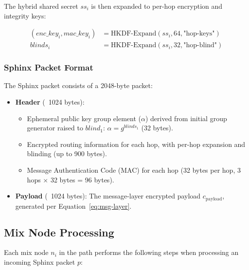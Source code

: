 \documentclass[11pt]{article}
\theoremstyle{definition}
\theoremstyle{remark}
\begin{document}
The hybrid shared secret $ss_i$ is then expanded to per-hop encryption and integrity keys:

\begin{align}
(enc\_key_i, mac\_key_i) &= \text{HKDF-Expand}(ss_i, 64, \text{"hop-keys"}) \label{eq:hop-keys}\\
blinds_i &= \text{HKDF-Expand}(ss_i, 32, \text{"hop-blind"}) \label{eq:blinding}
\end{align}

\subsubsection{Sphinx Packet Format}

The Sphinx packet consists of a 2048-byte packet:

\begin{itemize}
    \item \textbf{Header} (~1024 bytes):
    \begin{itemize}
        \item Ephemeral public key group element ($\alpha$) derived from initial group generator raised to $blind_1$: $\alpha = g^{blinds_1}$ (32 bytes).
        \item Encrypted routing information for each hop, with per-hop expansion and blinding (up to 900 bytes).
        \item Message Authentication Code (MAC) for each hop (32 bytes per hop, 3 hops $\times$ 32 bytes = 96 bytes).
    \end{itemize}

    \item \textbf{Payload} (~1024 bytes): The message-layer encrypted payload $c_{\text{payload}}$, generated per Equation~\eqref{eq:msg-layer}.
\end{itemize}

\subsection{Mix Node Processing}
\label{subsec:mixproc}

Each mix node $n_i$ in the path performs the following steps when processing an incoming Sphinx packet $p$:
\end{document}
